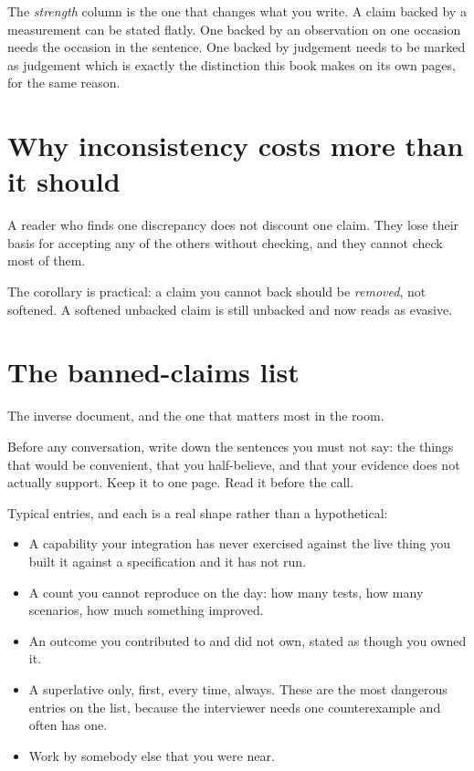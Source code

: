 \begin{kitnote}
The \emph{strength} column is the one that changes what you write. A claim
backed by a measurement can be stated flatly. One backed by an observation on
one occasion needs the occasion in the sentence. One backed by judgement needs
to be marked as judgement \dash{} which is exactly the distinction this book
makes on its own pages, for the same reason.
\end{kitnote}

\section{Why inconsistency costs more than it should}

A reader who finds one discrepancy does not discount one claim. They lose their
basis for accepting any of the others without checking, and they cannot check
most of them.


The corollary is practical: a claim you cannot back should be \emph{removed},
not softened. A softened unbacked claim is still unbacked and now reads as
evasive.

\section{The banned-claims list}

The inverse document, and the one that matters most in the room.

Before any conversation, write down the sentences you must not say: the things
that would be convenient, that you half-believe, and that your evidence does
not actually support. Keep it to one page. Read it before the call.

Typical entries, and each is a real shape rather than a hypothetical:

\begin{itemize}
  \item A capability your integration has never exercised against the live
        thing \dash{} you built it against a specification and it has not run.
  \item A count you cannot reproduce on the day: how many tests, how many
        scenarios, how much something improved.
  \item An outcome you contributed to and did not own, stated as though you
        owned it.
  \item A superlative \dash{} only, first, every time, always. These are the
        most dangerous entries on the list, because the interviewer needs one
        counterexample and often has one.
  \item Work by somebody else that you were near.
\end{itemize}

